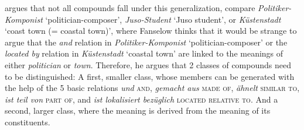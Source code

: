 \citet[156]{Fanselow:1981} argues that not all compounds fall under
this generalization, compare \emph{Politiker-Komponist} `politician-composer', 
  \emph{Juso-Student} `Juso student',  or \emph{Küstenstadt} `coast
  town (= coastal town)', where Fanselow thinks that it would be strange to argue that the
  \emph{and} relation in \emph{Politiker-Komponist} `politician-composer' or the \emph{located by} relation
  in \emph{Küstenstadt} `coastal town' are linked to the meanings of either
  \emph{politician} or \emph{town}. Therefore, he argues that 2 classes of
  compounds need to be distinguished: A first, smaller class, whose members
  can be generated with the help of the 5 basic relations
  \emph{und} \textsc{and}, \emph{gemacht aus} \textsc{made of}, \emph{ähnelt}
  \textsc{similar to}, \emph{ist teil von} \textsc{part of}, and 
      \emph{ist lokalisiert bezüglich} \textsc{located relative to}. %
And a second, larger class, where the  meaning is derived from the
meaning of its constituents.

